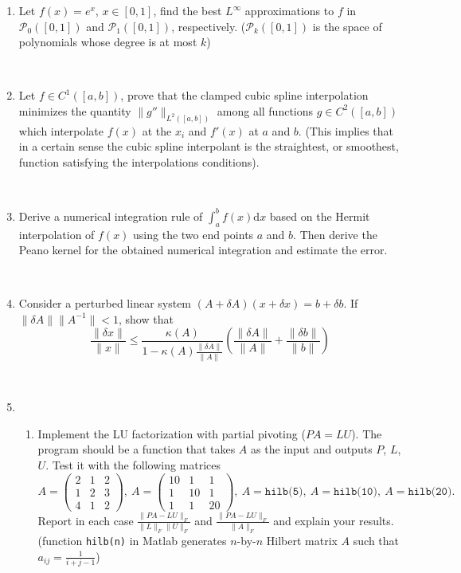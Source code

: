 \documentclass[12pt]{article}
\begin{document}
\begin{enumerate}
\item Let $f(x) = e^x$, $x \in [0,1]$, find the best $L^{\infty}$ approximations to $f$ in $\mathcal{P}_0([0,1])$ and $\mathcal{P}_1([0,1])$, respectively. ($\mathcal{P}_k([0,1])$ is the space of polynomials whose degree is at most $k$)

\

\item Let $f \in C^1([a,b])$, prove that the clamped cubic spline interpolation minimizes the quantity $\| g'' \|_{L^2([a,b])}$ among all functions $g \in C^2([a,b])$ which interpolate $f(x)$ at the $x_i$ and $f'(x)$ at $a$ and $b$.  (This implies that in a certain sense the cubic spline interpolant is the straightest, or smoothest, function satisfying the interpolations conditions).

\

\item Derive a numerical integration rule of $\int_{a}^b f(x) \mathrm{d}x$ based on the Hermit interpolation of $f(x)$ using the two end points $a$ and $b$.  Then derive the Peano kernel for the obtained numerical integration and estimate the error.  

\

\item Consider a perturbed linear system $(A+\delta A)(x+\delta x) = b + \delta b$.  If $\| \delta A \| \| A^{-1} \| < 1$, show that
$$
\frac{\| \delta x \|}{\|x \|} \leq \frac{\kappa(A)}{1-\kappa(A) \frac{ \| \delta A\|}{\| A \|}} \left(  \frac{\| \delta A \|}{\| A \|} + \frac{\| \delta b \|}{\| b \|} \right)
$$

\

\item 
\begin{enumerate}
\item  Implement the LU factorization with partial pivoting ($PA = LU$).  The program should be a function that takes $A$ as the input and outputs $P$, $L$, $U$.  Test it with the following matrices
\begin{equation*} \label{eqn:1}
A = 
\begin{pmatrix}
2 & 1 & 2 \\
1 & 2 & 3 \\
4 & 1 & 2 
\end{pmatrix}, 
\
A =
\begin{pmatrix}
10 & 1 & 1 \\
1 & 10 & 1 \\
1 & 1 & 20
\end{pmatrix},
\
A = \texttt{hilb(5)},
\
A = \texttt{hilb(10)},
\
A = \texttt{hilb(20)}.
\end{equation*}
Report in each case $\frac{\| PA - LU \|_F}{\| L\|_F \| U \|_F}$ and $\frac{\| PA - LU \|_{F}}{\| A \|_F}$ and explain your results. (function \texttt{hilb(n)} in Matlab generates $n$-by-$n$ Hilbert matrix $A$ such that $a_{ij} = \frac{1}{i+j-1}$)


\end{enumerate}
\end{enumerate}
\end{document}
